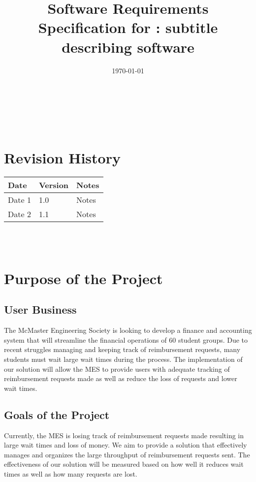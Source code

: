 \documentclass[12pt]{article}
\begin{document}
\title{Software Requirements Specification for \progname: subtitle describing software} 
\author{\authname}
\date{\today}
	
\maketitle

~\newpage


\tableofcontents

~\newpage

\section*{Revision History}

\begin{tabularx}{\textwidth}{p{3cm}p{2cm}X}
\toprule {\textbf{Date}} & {\textbf{Version}} & {\textbf{Notes}}\\
\midrule
Date 1 & 1.0 & Notes\\
Date 2 & 1.1 & Notes\\
\bottomrule
\end{tabularx}

~\\

~\newpage
\section{Purpose of the Project}
\subsection{User Business}
The McMaster Engineering Society is looking to develop a finance and accounting system that will streamline the financial operations of 60 student groups. Due to recent struggles managing and keeping track of reimbursement requests, many students must wait large wait times during the process. The implementation of our solution will allow the MES to provide users with adequate tracking of reimbursement requests made as well as reduce the loss of requests and lower wait times.


\subsection{Goals of the Project}
Currently, the MES is losing track of reimbursement requests made resulting in large wait times and loss of money. We aim to provide a solution that effectively manages and organizes the large throughput of reimbursement requests sent. The effectiveness of our solution will be measured based on how well it reduces wait times as well as how many requests are lost.
\end{document}
